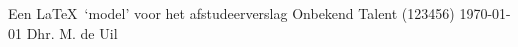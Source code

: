 \documentclass[11pt,a4paper,twoside,dutch]{report}%
\newif\ifpublic \newif\iftwocol %
\begin{document}
\titelblad                   %
  {Een \LaTeX\ `model' voor het afstudeerverslag} %
  {Onbekend Talent (123456)} %
  {\TI}                      %
  {\today}                   %
  {Dhr. M. de Uil}           %
  {}                         %
\ifpublic
  {\footnotesize{}}
\else
  \tableofcontents         %
\fi
\ifpublic
  \iflanguage{dutch}{\def\bibname{\normalsize{Bronnen}}}
                    {\def\bibname{\normalsize{References}}}
  {\footnotesize{}}   %
\else
  \appendix
\fi
\end{document}
